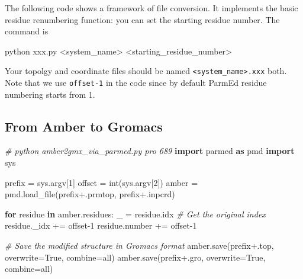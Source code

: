 \documentclass[
]{article}
\newenvironment{Shaded}{}{}
\newcommand{\BuiltInTok}[1]{\textcolor[rgb]{0.00,0.50,0.00}{#1}}
\newcommand{\CommentTok}[1]{\textcolor[rgb]{0.38,0.63,0.69}{\textit{#1}}}
\newcommand{\ControlFlowTok}[1]{\textcolor[rgb]{0.00,0.44,0.13}{\textbf{#1}}}
\newcommand{\DecValTok}[1]{\textcolor[rgb]{0.25,0.63,0.44}{#1}}
\newcommand{\ExtensionTok}[1]{#1}
\newcommand{\ImportTok}[1]{\textcolor[rgb]{0.00,0.50,0.00}{\textbf{#1}}}
\newcommand{\KeywordTok}[1]{\textcolor[rgb]{0.00,0.44,0.13}{\textbf{#1}}}
\newcommand{\NormalTok}[1]{#1}
\newcommand{\OperatorTok}[1]{\textcolor[rgb]{0.40,0.40,0.40}{#1}}
\newcommand{\StringTok}[1]{\textcolor[rgb]{0.25,0.44,0.63}{#1}}
\newcommand{\VariableTok}[1]{\textcolor[rgb]{0.10,0.09,0.49}{#1}}
\begin{document}
The following code shows a framework of file conversion. It implements
the basic residue renumbering function: you can set the starting residue
number. The command is

\begin{Shaded}
\begin{Highlighting}[]
\ExtensionTok{python}\NormalTok{ xxx.py }\OperatorTok{\textless{}}\NormalTok{system\_name}\OperatorTok{\textgreater{}} \OperatorTok{\textless{}}\NormalTok{starting\_residue\_number}\OperatorTok{\textgreater{}}
\end{Highlighting}
\end{Shaded}

Your topolgy and coordinate files should be named
\texttt{\textless{}system\_name\textgreater{}.xxx} both. Note that we
use \texttt{offset-1} in the code since by default ParmEd residue
numbering starts from 1.

\hypertarget{from-amber-to-gromacs}{%
\subsection{From Amber to Gromacs}\label{from-amber-to-gromacs}}

\begin{Shaded}
\begin{Highlighting}[]
\CommentTok{\# python amber2gmx\_via\_parmed.py pro 689}
\ImportTok{import}\NormalTok{ parmed }\ImportTok{as}\NormalTok{ pmd}
\ImportTok{import}\NormalTok{ sys}

\NormalTok{prefix }\OperatorTok{=}\NormalTok{ sys.argv[}\DecValTok{1}\NormalTok{]}
\NormalTok{offset }\OperatorTok{=} \BuiltInTok{int}\NormalTok{(sys.argv[}\DecValTok{2}\NormalTok{])}
\NormalTok{amber }\OperatorTok{=}\NormalTok{ pmd.load\_file(prefix}\OperatorTok{+}\StringTok{\textquotesingle{}.prmtop\textquotesingle{}}\NormalTok{, prefix}\OperatorTok{+}\StringTok{\textquotesingle{}.inpcrd\textquotesingle{}}\NormalTok{)}

\ControlFlowTok{for}\NormalTok{ residue }\KeywordTok{in}\NormalTok{ amber.residues:}
\NormalTok{    \_ }\OperatorTok{=}\NormalTok{ residue.idx  }\CommentTok{\# Get the original index}
\NormalTok{    residue.\_idx }\OperatorTok{+=}\NormalTok{ offset}\OperatorTok{{-}}\DecValTok{1}
\NormalTok{    residue.number }\OperatorTok{+=}\NormalTok{ offset}\OperatorTok{{-}}\DecValTok{1}

\CommentTok{\# Save the modified structure in Gromacs format}
\NormalTok{amber.save(prefix}\OperatorTok{+}\StringTok{\textquotesingle{}.top\textquotesingle{}}\NormalTok{, overwrite}\OperatorTok{=}\VariableTok{True}\NormalTok{, combine}\OperatorTok{=}\StringTok{\textquotesingle{}all\textquotesingle{}}\NormalTok{)}
\NormalTok{amber.save(prefix}\OperatorTok{+}\StringTok{\textquotesingle{}.gro\textquotesingle{}}\NormalTok{, overwrite}\OperatorTok{=}\VariableTok{True}\NormalTok{, combine}\OperatorTok{=}\StringTok{\textquotesingle{}all\textquotesingle{}}\NormalTok{)}
\end{Highlighting}
\end{Shaded}
\end{document}
